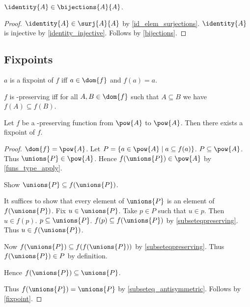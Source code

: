 \begin{proposition}\label{id_elem_bijections}
    $\identity{A}\in\bijections{A}{A}$.
\end{proposition}
\begin{proof}
    $\identity{A}\in\surj{A}{A}$ by \cref{id_elem_surjections}.
    $\identity{A}$ is injective by \cref{identity_injective}.
    Follows by \cref{bijections}.
\end{proof}
\subsection{Fixpoints}

\begin{definition}\label{fixpoint}
    $a$ is a fixpoint of $f$ iff $a\in\dom{f}$ and $f(a) = a$.
\end{definition}

\begin{definition}\label{subseteqpreserving}
    $f$ is \subseteq-preserving iff
    for all $A, B\in\dom{f}$ such that $A\subseteq B$ we have $f(A)\subseteq f(B)$.
\end{definition}

\begin{theorem}\label{knastertarski}
    Let $f$ be a \subseteq-preserving function from $\pow{A}$ to $\pow{A}$.
    Then there exists a fixpoint of $f$.
\end{theorem}
\begin{proof}
    $\dom{f} = \pow{A}$.
    Let $P = \{a\in\pow{A}\mid a\subseteq f(a)\}$.
    $P\subseteq\pow{A}$.
    Thus $\unions{P}\in\pow{A}$.
    Hence $f(\unions{P})\in\pow{A}$ by \cref{funs_type_apply}.

    Show $\unions{P}\subseteq f(\unions{P})$.
    \begin{subproof}
        It suffices to show that every element of $\unions{P}$ is an element of $f(\unions{P})$.
        Fix $u\in\unions{P}$.
        Take $p\in P$ such that $u\in p$.
        Then $u\in f(p)$.
        $p\subseteq\unions{P}$.
        $f(p)\subseteq f(\unions{P})$ by \cref{subseteqpreserving}.
        Thus $u\in f(\unions{P})$.
    \end{subproof}

    Now $f(\unions{P})\subseteq f(f(\unions{P}))$ by \cref{subseteqpreserving}.
    Thus $f(\unions{P})\in P$ by definition.

    Hence $f(\unions{P})\subseteq \unions{P}$.

    Thus $f(\unions{P}) = \unions{P}$ by \cref{subseteq_antisymmetric}.
    Follows by \cref{fixpoint}.
\end{proof}
